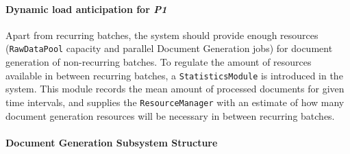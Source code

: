 \documentclass[a4paper,10pt]{article}
\begin{document}
\paragraph{Dynamic load anticipation for \emph{P1}}
Apart from recurring batches, the system should provide enough resources (\texttt{RawDataPool} capacity and parallel Document Generation jobs) for document generation of non-recurring batches. To regulate the amount of resources available in between recurring batches, a \texttt{StatisticsModule} is introduced in the system. This module records the mean amount of processed documents for given time intervals, and supplies the \texttt{ResourceManager} with an estimate of how many document generation resources will be necessary in between recurring batches.

\paragraph{Document Generation Subsystem Structure}
\end{document}
